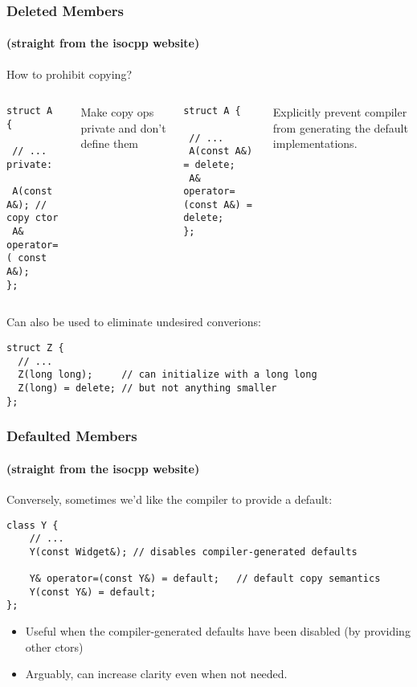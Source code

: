 \begin{frame}[fragile]
\frametitle{Deleted Members}
\framesubtitle{(straight from the isocpp website)}
How to prohibit copying?
\begin{columns}[t]
{\scriptsize

\begin{verbatim}
struct A {

 // ...
private:

 A(const A&); // copy ctor
 A& operator=( const A&);
};
\end{verbatim}

Make copy ops private and don't define them
}
\pause{}
{\scriptsize
\begin{verbatim}
struct A {

 // ...
 A(const A&) = delete; 
 A& operator=(const A&) = delete;
};
\end{verbatim}

Explicitly prevent compiler from generating the default implementations.
}
\end{columns}

\pause{}
\vskip 12pt
Can also be used to eliminate undesired converions:
{\scriptsize
\begin{verbatim}
struct Z {
  // ...
  Z(long long);     // can initialize with a long long
  Z(long) = delete; // but not anything smaller
};
\end{verbatim}
}

\end{frame}



\begin{frame}[fragile]
\frametitle{Defaulted Members}
\framesubtitle{(straight from the isocpp website)}
Conversely, sometimes we'd like the compiler to provide a default: 
{\scriptsize
\begin{verbatim}
class Y {
    // ...
    Y(const Widget&); // disables compiler-generated defaults

    Y& operator=(const Y&) = default;   // default copy semantics
    Y(const Y&) = default;
};
\end{verbatim}
}
\pause{}
\begin{itemize}
\item Useful when the compiler-generated defaults have been disabled (by
providing other ctors)
\item Arguably, can increase clarity even when not needed.
\end{itemize}
\end{frame}
